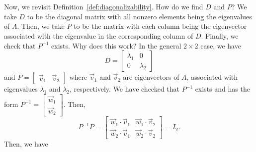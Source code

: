         \pagebreak
        \vphantom
        \\
        \\
        Now, we revisit Definition~\ref{def:diagonalizability}. How do we find \(D\) and \(P\)? We take \(D\) to be the diagonal matrix with all nonzero elements being the eigenvalues of \(A\). Then, we take \(P\) to be the matrix with each column being the eigenvector associated with the eigenvalue in the corresponding column of \(D\). Finally, we check that \(P^{-1}\) exists. Why does this work? In the general \(2\times 2\) case, we have
        \begin{equation*}
            D=\begin{bmatrix}
                \lambda_1 & 0 \\ 0 & \lambda_2
            \end{bmatrix}
        \end{equation*}
        and \(P=\begin{bmatrix} \vec{v}_1 & \vec{v}_2 \end{bmatrix}\) where \(\vec{v}_1\) and \(\vec{v}_2\) are eigenvectors of \(A\), associated with eigenvalues \(\lambda_1\) and \(\lambda_2\), respectively. We have checked that \(P^{-1}\) exists and has the form \(P^{-1}=\begin{bmatrix} \vec{w}_1 \\ \vec{w}_2 \end{bmatrix}\). Then, 
        \begin{equation*}
            P^{-1}P=\begin{bmatrix} \vec{w}_1\cdot\vec{v}_1 & \vec{w}_1\cdot\vec{v}_2 \\ \vec{w}_2\cdot\vec{v}_1 & \vec{w}_2\cdot\vec{v}_2 \end{bmatrix}=I_2.
        \end{equation*}
        Then, we have
